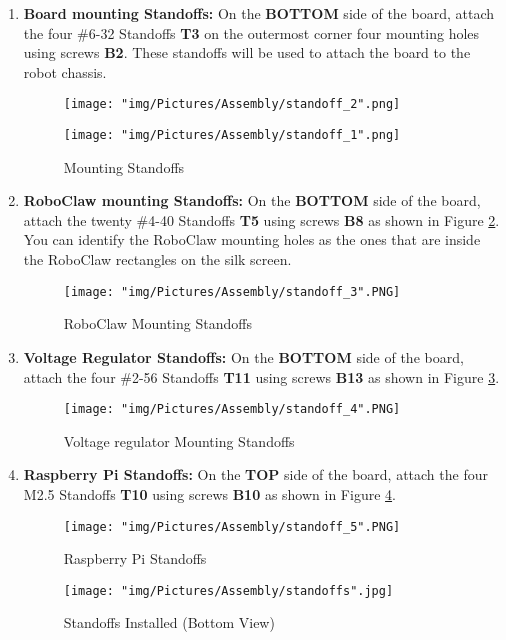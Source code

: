 \documentclass{article}
\begin{document}
\begin{enumerate}
\item \textbf{Board mounting Standoffs:} On the \textbf{BOTTOM} side of the board, attach the four \#6-32 Standoffs \textbf{T3} on the outermost corner four mounting holes using screws \textbf{B2}.  These standoffs will be used to attach the board to the robot chassis.

\begin{figure}[H]
  \centering
  \begin{minipage}[b]{0.45\textwidth}
    \texttt{[image: "img/Pictures/Assembly/standoff\_2".png]}
  \end{minipage}
  \hfill
  \begin{minipage}[b]{0.45\textwidth}
    \texttt{[image: "img/Pictures/Assembly/standoff\_1".png]}
  \end{minipage}
  \caption{Mounting Standoffs}
  \label{standoffs_1}
\end{figure}

\item \textbf{RoboClaw mounting Standoffs:} On the \textbf{BOTTOM} side of the board, attach the twenty \#4-40 Standoffs \textbf{T5} using screws \textbf{B8} as shown in Figure \ref{standoffs_2}. You can identify the RoboClaw mounting holes as the ones that are inside the RoboClaw rectangles on the silk screen.


\begin{figure}[H]
	\centering
	\texttt{[image: "img/Pictures/Assembly/standoff\_3".PNG]}
  \caption{RoboClaw Mounting Standoffs}
  \label{standoffs_2}
\end{figure}

\item \textbf{Voltage Regulator Standoffs:} On the \textbf{BOTTOM} side of the board, attach the four \#2-56 Standoffs \textbf{T11} using screws \textbf{B13} as shown in Figure \ref{standoffs_3}. 

\begin{figure}[H]
	\centering
	\texttt{[image: "img/Pictures/Assembly/standoff\_4".PNG]}
  \caption{Voltage regulator Mounting Standoffs}
  \label{standoffs_3}
\end{figure}

\item \textbf{Raspberry Pi  Standoffs:} On the \textbf{TOP} side of the board, attach the four M2.5 Standoffs \textbf{T10} using screws \textbf{B10} as shown in Figure \ref{standoffs_4}. 

\begin{figure}[H]
	\centering
	\texttt{[image: "img/Pictures/Assembly/standoff\_5".PNG]}
  \caption{Raspberry Pi Standoffs}
  \label{standoffs_4}
\end{figure}

\begin{figure}[H]
	\centering
	\texttt{[image: "img/Pictures/Assembly/standoffs".jpg]}
	\caption{Standoffs Installed (Bottom View)}
\end{figure}


\end{enumerate}
\end{document}
